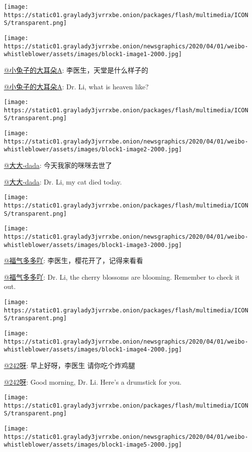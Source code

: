 \texttt{[image: https://static01.graylady3jvrrxbe.onion/packages/flash/multimedia/ICONS/transparent.png]}

\texttt{[image: https://static01.graylady3jvrrxbe.onion/newsgraphics/2020/04/01/weibo-whistleblower/assets/images/block1-image1-2000.jpg]}

\href{https://www.weibo.com/u/6019778129}{@小兔子的大耳朵A}:
李医生，天堂是什么样子的

\href{https://www.weibo.com/u/6019778129}{@小兔子的大耳朵A}: Dr. Li,
what is heaven like?

\texttt{[image: https://static01.graylady3jvrrxbe.onion/packages/flash/multimedia/ICONS/transparent.png]}

\texttt{[image: https://static01.graylady3jvrrxbe.onion/newsgraphics/2020/04/01/weibo-whistleblower/assets/images/block1-image2-2000.jpg]}

\href{https://www.weibo.com/u/1938903587}{@大大-dada}:
今天我家的咪咪去世了

\href{https://www.weibo.com/u/1938903587}{@大大-dada}: Dr. Li, my cat
died today.

\texttt{[image: https://static01.graylady3jvrrxbe.onion/packages/flash/multimedia/ICONS/transparent.png]}

\texttt{[image: https://static01.graylady3jvrrxbe.onion/newsgraphics/2020/04/01/weibo-whistleblower/assets/images/block1-image3-2000.jpg]}

\href{https://www.weibo.com/u/2125628633}{@福气多多吖}:
李医生，樱花开了，记得来看看

\href{https://www.weibo.com/u/2125628633}{@福气多多吖}: Dr. Li, the
cherry blossoms are blooming. Remember to check it out.

\texttt{[image: https://static01.graylady3jvrrxbe.onion/packages/flash/multimedia/ICONS/transparent.png]}

\texttt{[image: https://static01.graylady3jvrrxbe.onion/newsgraphics/2020/04/01/weibo-whistleblower/assets/images/block1-image4-2000.jpg]}

\href{https://www.weibo.com/u/1750956573}{@242呀}: 早上好呀，李医生
请你吃个炸鸡腿🍗

\href{https://www.weibo.com/u/1750956573}{@242呀}: Good morning, Dr. Li.
Here's a drumstick for you. 🍗

\texttt{[image: https://static01.graylady3jvrrxbe.onion/packages/flash/multimedia/ICONS/transparent.png]}

\texttt{[image: https://static01.graylady3jvrrxbe.onion/newsgraphics/2020/04/01/weibo-whistleblower/assets/images/block1-image5-2000.jpg]}

